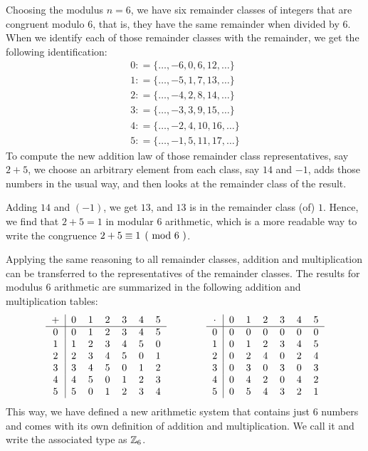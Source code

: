 \begin{example} 
\label{def_residue_ring_z_6}
Choosing the modulus $ n = 6 $, we have six remainder classes of integers that are congruent modulo $ 6 $, that is, they have the same remainder when divided by $6$. When we identify each of those remainder classes with the remainder, we get the following identification:
$$
\begin{array}{l}
0: = \{\ldots, -6,0,6,12, \ldots \}\\
1: = \{\ldots, -5,1,7,13, \ldots \}\\
2: = \{\ldots, -4,2,8,14, \ldots \} \\
3: = \{\ldots, -3,3,9,15, \ldots \}\\
4: = \{\ldots, -2,4,10,16, \ldots \}\\
5: = \{\ldots, -1,5,11,17, \ldots \}
\end{array}
$$
To compute the new addition law of those remainder class representatives, say $2+5$, we choose an arbitrary element from each class, say $14$ and $-1$, adds those numbers in the usual way, and then looks at the remainder class of the result.

Adding $14$ and $(-1)$, we get $13$, and $13$ is in the remainder class (of) $1$. Hence, we find that $2+5=1$ in modular $6$ arithmetic, which is a more readable way to write the congruence $\kongru{2+5}{1}{6}$.

Applying the same reasoning to all remainder classes, addition and multiplication can  be transferred to the representatives of the remainder classes. The results for modulus $6$ arithmetic are summarized in the following addition and multiplication tables:
\begin{equation}\label{eq:Z6_tables}
  \begin{tabular}{c | c c c c c c}
    + & 0 & 1 & 2 & 3 & 4 & 5\\\hline
    0 & 0 & 1 & 2 & 3 & 4 & 5 \\
    1 & 1 & 2 & 3 & 4 & 5 & 0\\
    2 & 2 & 3 & 4 & 5 & 0 & 1\\
    3 & 3 & 4 & 5 & 0 & 1 & 2\\
    4 & 4 & 5 & 0 & 1 & 2 & 3\\
    5 & 5 & 0 & 1 & 2 & 3 & 4
  \end{tabular} \quad \quad \quad \quad
  \begin{tabular}{c | c c c c c c}
$ \cdot $ & 0 & 1 & 2 & 3 & 4 & 5 \\\hline
        0 & 0 & 0 & 0 & 0 & 0 & 0\\
        1 & 0 & 1 & 2 & 3 & 4 & 5\\
        2 & 0 & 2 & 4 & 0 & 2 & 4\\
        3 & 0 & 3 & 0 & 3 & 0 & 3\\
        4 & 0 & 4 & 2 & 0 & 4 & 2\\
        5 & 0 & 5 & 4 & 3 & 2 & 1
  \end{tabular}
\end{equation}
This way, we have defined a new arithmetic system that contains just $6$ numbers and comes with its own definition of addition and multiplication. We call it  and write the associated type as $\mathbb{Z}_6$.


\end{example}
